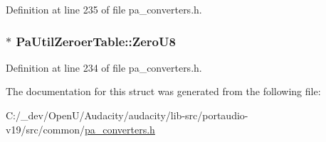 Definition at line 235 of file pa\+\_\+converters.\+h.

\subsubsection[{\texorpdfstring{Zero\+U8}{ZeroU8}}]{$\ast$ Pa\+Util\+Zeroer\+Table\+::\+Zero\+U8}\hypertarget{struct_pa_util_zeroer_table_ac1c2f1378f4ef904a85f068f89e6cfac}{}\label{struct_pa_util_zeroer_table_ac1c2f1378f4ef904a85f068f89e6cfac}


Definition at line 234 of file pa\+\_\+converters.\+h.



The documentation for this struct was generated from the following file\+:\begin{DoxyCompactItemize}
\item 
C\+:/\+\_\+dev/\+Open\+U/\+Audacity/audacity/lib-\/src/portaudio-\/v19/src/common/\hyperlink{pa__converters_8h}{pa\+\_\+converters.\+h}\end{DoxyCompactItemize}
